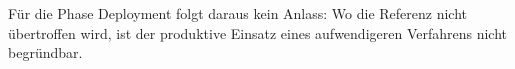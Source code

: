 \documentclass[12pt,a4paper]{article}
\begin{document}
Für die Phase Deployment folgt daraus kein Anlass: Wo die Referenz nicht übertroffen wird, ist der produktive Einsatz eines aufwendigeren Verfahrens nicht begründbar.
%
%
%
\end{document}
